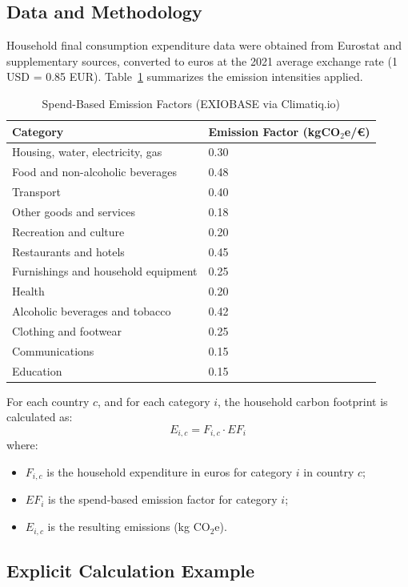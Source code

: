 \documentclass[12pt,a4paper]{article}%
\begin{document}
\subsection{Data and Methodology}

Household final consumption expenditure data were obtained from Eurostat and supplementary sources, converted to euros at the 2021 average exchange rate (1 USD = 0.85 EUR). Table~\ref{tab:efactors} summarizes the emission intensities applied.

\begin{table}[h]
\centering
\caption{Spend-Based Emission Factors (EXIOBASE via Climatiq.io)}\label{tab:efactors}
\begin{tabular}{@{}ll@{}}
\toprule
\textbf{Category} & \textbf{Emission Factor (kgCO$_{2}$e/€)}\\
\midrule
Housing, water, electricity, gas & 0.30\\
Food and non-alcoholic beverages & 0.48\\
Transport & 0.40\\
Other goods and services & 0.18\\
Recreation and culture & 0.20\\
Restaurants and hotels & 0.45\\
Furnishings and household equipment & 0.25\\
Health & 0.20\\
Alcoholic beverages and tobacco & 0.42\\
Clothing and footwear & 0.25\\
Communications & 0.15\\
Education & 0.15\\
\bottomrule
\end{tabular}
\end{table}

For each country $c$, and for each category $i$, the household carbon footprint is calculated as:
\[
E_{i,c} = F_{i,c} \cdot EF_i
\]
where:
\begin{itemize}
    \item $F_{i,c}$ is the household expenditure in euros for category $i$ in country $c$;
    \item $EF_i$ is the spend-based emission factor for category $i$;
    \item $E_{i,c}$ is the resulting emissions (kg CO$_{2}$e).
\end{itemize}

\subsection{Explicit Calculation Example}
\end{document}
